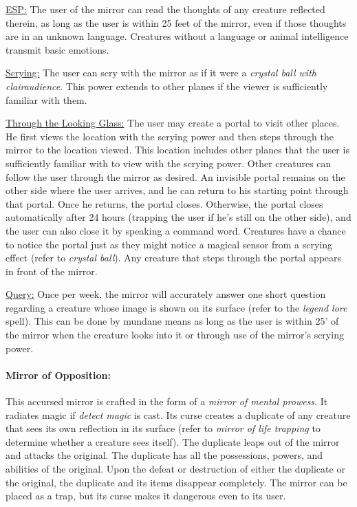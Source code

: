 \begin{multicols}{2}
\underline{ESP:} The user of the mirror can read the thoughts of any creature reflected therein, as long as the user is within 25 feet of the mirror, even if those thoughts are in an unknown language.  Creatures without a language or animal intelligence transmit basic emotions.

\underline{Scrying:} The user can scry with the mirror as if it were a \textit{crystal ball with clairaudience}.  This power extends to other planes if the viewer is sufficiently familiar with them.

\underline{Through the Looking Glass:} The user may create a portal to visit other places.  He first views the location with the scrying power and then steps through the mirror to the location viewed.  This location includes other planes that the user is sufficiently familiar with to view with the scrying power.  Other creatures can follow the user through the mirror as desired.  An invisible portal remains on the other side where the user arrives, and he can return to his starting point through that portal.  Once he returns, the portal closes.  Otherwise, the portal closes automatically after 24 hours (trapping the user if he's still on the other side), and the user can also close it by speaking a command word.  Creatures have a chance to notice the portal just as they might notice a magical sensor from a scrying effect (refer to \textit{crystal ball}).  Any creature that steps through the portal appears in front of the mirror.

\underline{Query:} Once per week, the mirror will accurately answer one short question regarding a creature whose image is shown on its surface (refer to the \textit{legend lore} spell).  This can be done by mundane means as long as the user is within 25' of the mirror when the creature looks into it or through use of the mirror's scrying power.

\paragraph{Mirror of Opposition:} This accursed mirror is crafted in the form of a \textit{mirror of mental prowess}.  It radiates magic if \textit{detect magic} is cast.  Its curse creates a duplicate of any creature that sees its own reflection in its surface (refer to \textit{mirror of life trapping} to determine whether a creature sees itself).  The duplicate leaps out of the mirror and attacks the original.  The duplicate has all the possessions, powers, and abilities of the original.  Upon the defeat or destruction of either the duplicate or the original, the duplicate and its items disappear completely.  The mirror can be placed as a trap, but its curse makes it dangerous even to its user.


\end{multicols}
